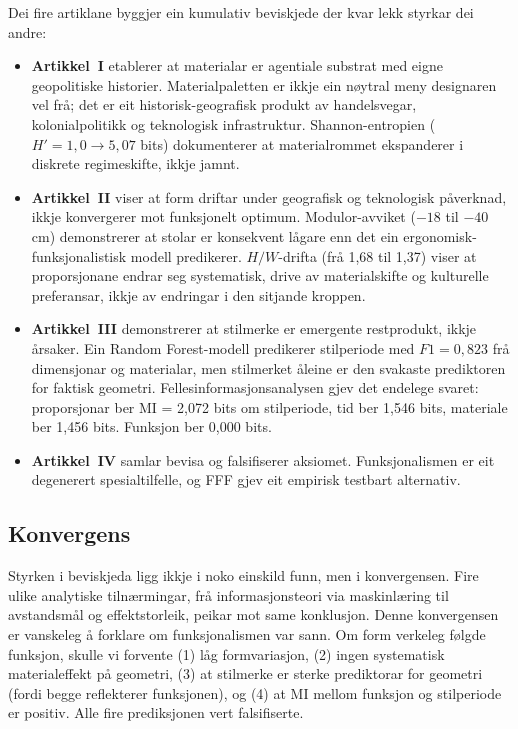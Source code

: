 \documentclass[12pt, a4paper]{article}
\begin{document}
Dei fire artiklane byggjer ein kumulativ beviskjede der kvar lekk styrkar dei andre:

\begin{itemize}
  \item \textbf{Artikkel~I} etablerer at materialar er agentiale substrat med eigne geopolitiske historier. Materialpaletten er ikkje ein nøytral meny designaren vel frå; det er eit historisk-geografisk produkt av handelsvegar, kolonialpolitikk og teknologisk infrastruktur. Shannon-entropien ($H' = 1{,}0 \rightarrow 5{,}07$ bits) dokumenterer at materialrommet ekspanderer i diskrete regimeskifte, ikkje jamnt.
  \item \textbf{Artikkel~II} viser at form driftar under geografisk og teknologisk påverknad, ikkje konvergerer mot funksjonelt optimum. Modulor-avviket ($-18$ til $-40$ cm) demonstrerer at stolar er konsekvent lågare enn det ein ergonomisk-funksjonalistisk modell predikerer. $H/W$-drifta (frå 1,68 til 1,37) viser at proporsjonane endrar seg systematisk, drive av materialskifte og kulturelle preferansar, ikkje av endringar i den sitjande kroppen.
  \item \textbf{Artikkel~III} demonstrerer at stilmerke er emergente restprodukt, ikkje årsaker. Ein Random Forest-modell predikerer stilperiode med $F1 = 0{,}823$ frå dimensjonar og materialar, men stilmerket åleine er den svakaste prediktoren for faktisk geometri. Fellesinformasjonsanalysen gjev det endelege svaret: proporsjonar ber MI = 2,072 bits om stilperiode, tid ber 1,546 bits, materiale ber 1,456 bits. Funksjon ber 0,000 bits.
  \item \textbf{Artikkel~IV} samlar bevisa og falsifiserer aksiomet. Funksjonalismen er eit degenerert spesialtilfelle, og FFF gjev eit empirisk testbart alternativ.
\end{itemize}

\subsection{Konvergens}

Styrken i beviskjeda ligg ikkje i noko einskild funn, men i konvergensen. Fire ulike analytiske tilnærmingar, frå informasjonsteori via maskinlæring til avstandsmål og effektstorleik, peikar mot same konklusjon. Denne konvergensen er vanskeleg å forklare om funksjonalismen var sann. Om form verkeleg følgde funksjon, skulle vi forvente (1) låg formvariasjon, (2) ingen systematisk materialeffekt på geometri, (3) at stilmerke er sterke prediktorar for geometri (fordi begge reflekterer funksjonen), og (4) at MI mellom funksjon og stilperiode er positiv. Alle fire prediksjonen vert falsifiserte.
\end{document}
